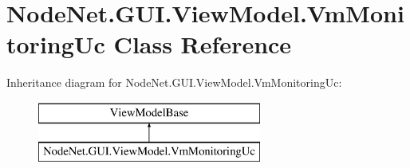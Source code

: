 \hypertarget{class_node_net_1_1_g_u_i_1_1_view_model_1_1_vm_monitoring_uc}{}\section{Node\+Net.\+G\+U\+I.\+View\+Model.\+Vm\+Monitoring\+Uc Class Reference}
\label{class_node_net_1_1_g_u_i_1_1_view_model_1_1_vm_monitoring_uc}
Inheritance diagram for Node\+Net.\+G\+U\+I.\+View\+Model.\+Vm\+Monitoring\+Uc\+:\begin{figure}[H]
\begin{center}
\leavevmode
\includegraphics[height=2.000000cm]{class_node_net_1_1_g_u_i_1_1_view_model_1_1_vm_monitoring_uc}
\end{center}
\end{figure}
